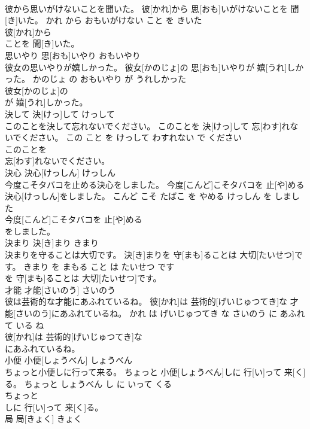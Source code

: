 \documentclass[8pt]{extreport}
\begin{document}
\begin{CJK}{UTF8}{min}
\\	彼から思いがけないことを聞いた。	彼[かれ]から 思[おも]いがけないことを 聞[き]いた。	かれ から おもいがけない こと を きいた	
\\	彼[かれ]から
\\	ことを 聞[き]いた。			
\\	思いやり	思[おも]いやり	おもいやり	
\\	彼女の思いやりが嬉しかった。	彼女[かのじょ]の 思[おも]いやりが 嬉[うれ]しかった。	かのじょ の おもいやり が うれしかった	
\\	彼女[かのじょ]の
\\	が 嬉[うれ]しかった。			
\\	決して	決[けっ]して	けっして	
\\	このことを決して忘れないでください。	このことを 決[けっ]して 忘[わす]れないでください。	この こと を けっして わすれない で ください	
\\	このことを
\\	忘[わす]れないでください。			
\\	決心	決心[けっしん]	けっしん	
\\	今度こそタバコを止める決心をしました。	今度[こんど]こそタバコを 止[や]める 決心[けっしん]をしました。	こんど こそ たばこ を やめる けっしん を しました	
\\	今度[こんど]こそタバコを 止[や]める
\\	をしました。			
\\	決まり	決[き]まり	きまり	
\\	決まりを守ることは大切です。	決[き]まりを 守[まも]ることは 大切[たいせつ]です。	きまり を まもる こと は たいせつ です	
\\	を 守[まも]ることは 大切[たいせつ]です。			
\\	才能	才能[さいのう]	さいのう	
\\	彼は芸術的な才能にあふれているね。	彼[かれ]は 芸術的[げいじゅつてき]な 才能[さいのう]にあふれているね。	かれ は げいじゅつてき な さいのう に あふれて いる ね	
\\	彼[かれ]は 芸術的[げいじゅつてき]な
\\	にあふれているね。			
\\	小便	小便[しょうべん]	しょうべん	
\\	ちょっと小便しに行って来る。	ちょっと 小便[しょうべん]しに 行[い]って 来[く]る。	ちょっと しょうべん し に いって くる	
\\	ちょっと
\\	しに 行[い]って 来[く]る。			
\\	局	局[きょく]	きょく	

\end{CJK}
\end{document}
